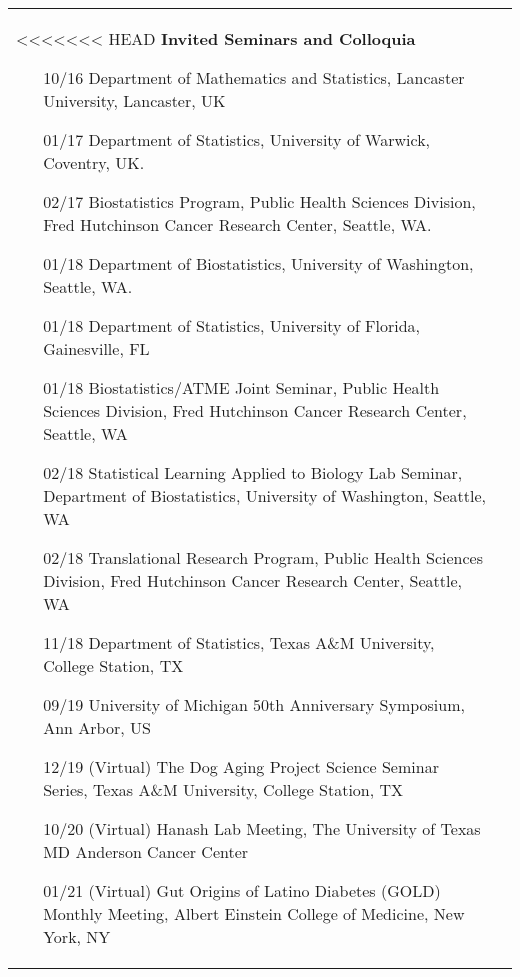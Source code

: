 \documentclass[10pt]{article}
\begin{document}
\begin{table}[H]
\begin{tabular}{p{1.6cm}p{12cm}}
\begin{enumerate}
<<<<<<< HEAD
\textbf{Invited Seminars and Colloquia}
\begin{enumerate}\setcounter{enumi}{14}
\item[10/16] Department of Mathematics and Statistics, Lancaster University, Lancaster, UK
\item[01/17] Department of Statistics, University of Warwick, Coventry, UK. 
\item[02/17] Biostatistics Program, Public Health Sciences Division, Fred Hutchinson Cancer Research Center, Seattle, WA.
\item[01/18] Department of Biostatistics, University of Washington, Seattle, WA.
\item[01/18] Department of Statistics, University of Florida, Gainesville, FL
\item[01/18] Biostatistics/ATME Joint Seminar, Public Health Sciences Division, Fred Hutchinson Cancer Research Center, Seattle, WA
\item[02/18] Statistical Learning Applied to Biology Lab Seminar, Department of Biostatistics, University of Washington, Seattle, WA
\item[02/18] Translational Research Program, Public Health Sciences Division, Fred Hutchinson Cancer Research Center, Seattle, WA
\item[11/18] Department of Statistics, Texas A\&M University, College Station, TX
\item[09/19] University of Michigan 50th Anniversary Symposium, Ann Arbor, US
\item[12/19] (Virtual) The Dog Aging Project Science Seminar Series, Texas A\&M University, College Station, TX
\item[10/20] (Virtual) Hanash Lab Meeting, The University of Texas MD Anderson Cancer Center
\item[01/21] (Virtual) Gut Origins of Latino Diabetes (GOLD) Monthly Meeting, Albert Einstein College of Medicine, New York, NY

\end{enumerate}
\end{enumerate}
\end{tabular}
\end{table}
\end{document}
